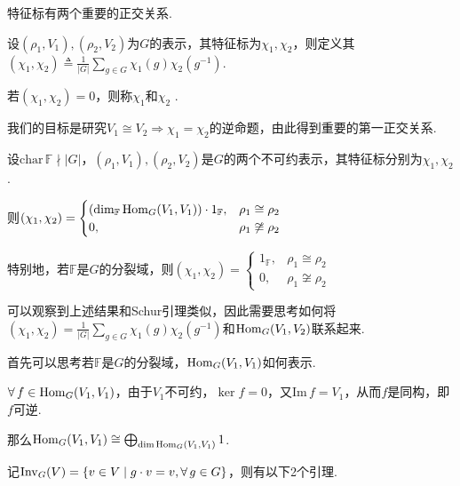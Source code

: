 特征标有两个重要的正交关系.\par

\begin{definition}[特征标函数的内积]
    设$(\rho_1,V_1),(\rho_2,V_2)$为$G$的表示，其特征标为$\chi_1,\chi_2$，则定义其$(\chi_1,\chi_2)\triangleq \frac{1}{|G|}\sum_{g\in G}\chi_1(g)\chi_2(g^{-1})$.
\end{definition}

\begin{definition}[特征标的正交]
    若$(\chi_1,\chi_2)=0$，则称$\chi_1$和$\chi_2$ .
\end{definition}

我们的目标是研究$V_1\cong V_2\Rightarrow \chi_1=\chi_2$的逆命题，由此得到重要的第一正交关系.\par

\begin{theorem}[第一正交关系]
    设$\mathrm{char}\,\mathbb{F}\nmid |G|$，$(\rho_1,V_1),(\rho_2,V_2)$是$G$的两个不可约表示，其特征标分别为$\chi_1,\chi_2$.\par
    则$(\chi_1,\chi_2)=\begin{cases}
    (\dim_\mathbb{F} \operatorname{Hom}_G(V_1,V_1))\cdot 1_\mathbb{F}, & \rho_1\cong \rho_2 \\
    0, & \rho_1\not\cong \rho_2
    \end{cases}$\par
    特别地，若$\mathbb{F}$是$G$的分裂域，则$(\chi_1,\chi_2)=\begin{cases}
    1_\mathbb{F}, & \rho_1\cong \rho_2 \\
    0, & \rho_1\not\cong \rho_2
    \end{cases}$
\end{theorem}

可以观察到上述结果和Schur引理类似，因此需要思考如何将$(\chi_1,\chi_2)=\frac{1}{|G|}\sum_{g\in G}\chi_1(g)\chi_2(g^{-1})$和$\operatorname{Hom}_G(V_1,V_2)$联系起来.\par
首先可以思考若$\mathbb{F}$是$G$的分裂域，$\operatorname{Hom}_G(V_1,V_1)$如何表示.\par

$\forall\, f\in \operatorname{Hom}_G(V_1,V_1)$，由于$V_1$不可约，$\ker f=0$，又$\mathrm{Im}\, f=V_1$，从而$f$是同构，即$f$可逆.\par
那么$\operatorname{Hom}_G(V_1,V_1)\cong \bigoplus_{\dim\operatorname{Hom}_G(V_1,V_1)} 1$.\par
记$\operatorname{Inv}_G(V)=\{v\in V\mid g\cdot v=v,\forall\, g\in G\}$，则有以下2个引理.\par

